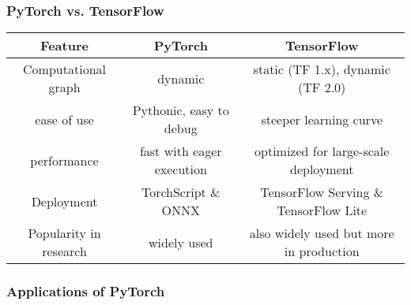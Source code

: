 \documentclass{article}
\begin{document}
\subsubsection{PyTorch vs. TensorFlow}

\begin{table}[H]
    \centering
    \begin{tabular}{|c|c|c|}
        \hline
        Feature & PyTorch & TensorFlow \\
        \hline
        Computational graph & dynamic & static (TF 1.x), dynamic (TF 2.0) \\
        \hline
        ease of use & Pythonic, easy to debug & steeper learning curve \\
        \hline
        performance & fast with eager execution & optimized for large-scale deployment \\
        \hline
        Deployment & TorchScript \& ONNX & TensorFlow Serving \& TensorFlow Lite \\
        \hline
        Popularity in research & widely used & also widely used but more in production \\
        \hline
    \end{tabular}
\end{table}


\subsubsection{Applications of PyTorch}
\end{document}
